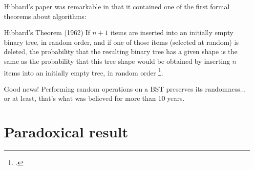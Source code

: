 \documentclass{beamer}
\begin{document}
\begin{frame}
    Hibbard’s paper was remarkable in that it contained one of the first formal theorems about algorithms:
    \pause
    \begin{block}{Hibbard's Theorem (1962)}
        If $n + 1$ items are inserted into an initially empty binary tree, in random order, and if one of those items (selected at random) is deleted, the probability that the resulting binary tree has a given shape is the same as the probability that this tree shape would be obtained by inserting $n$ items into an initially empty tree, in random order \footcite{hibbard1962}.
    \end{block}
    \pause
    Good news! Performing random operations on a BST preserves its randomness... 
    \pause
    or at least, that’s what was believed for more than 10 years.
\end{frame}


\section{Paradoxical result}
\end{document}
